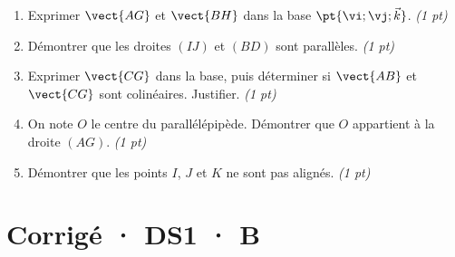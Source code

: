\begin{enumerate}

\item Exprimer $\vect{AG}$ et $\vect{BH}$ dans la base $\pt{\vi;\vj;\vec k}$. \hfill\textit{(1 pt)}

\item Démontrer que les droites $(IJ)$ et $(BD)$ sont parallèles. \hfill\textit{(1 pt)}

\item Exprimer $\vect{CG}$ dans la base, puis déterminer si $\vect{AB}$ et $\vect{CG}$ sont colinéaires. Justifier. \hfill\textit{(1 pt)}

\item On note $O$ le centre du parallélépipède. Démontrer que $O$ appartient à la droite $(AG)$. \hfill\textit{(1 pt)}

\item Démontrer que les points $I$, $J$ et $K$ ne sont pas alignés. \hfill\textit{(1 pt)}

\end{enumerate}

\ifmxteacher\mxnewpage

\section*{Corrigé · DS1 · B}\label{cor:1-4}

